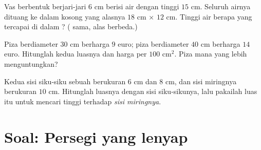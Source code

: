 \begin{exercise}[$\star\star$]\label{exo:g7:areas:10}
Vas berbentuk  berjari-jari $6$ cm berisi air dengan tinggi
$15$ cm. Seluruh airnya dituang ke dalam  kosong yang alasnya
$18$ cm $\times$ $12$ cm. Tinggi air berapa yang tercapai di dalam
? ( sama, alas berbeda.)
\end{exercise}

\begin{exercise}[$\star\star$]\label{exo:g7:areas:11}
Piza berdiameter $30$ cm berharga $9$ euro; piza berdiameter $40$ cm
berharga $14$ euro. Hitunglah kedua luasnya dan harga per $100$
cm$^2$. Piza mana yang lebih menguntungkan?
\end{exercise}

\begin{exercise}[$\star\star\star$]\label{exo:g7:areas:12}
Kedua sisi siku-siku sebuah  berukuran $6$ cm dan
$8$ cm, dan sisi miringnya berukuran $10$ cm. Hitunglah luasnya dengan
sisi siku-sikunya, lalu pakailah luas itu untuk mencari tinggi
terhadap \emph{sisi miringnya}.
\end{exercise}

\section{Soal: Persegi yang lenyap}

